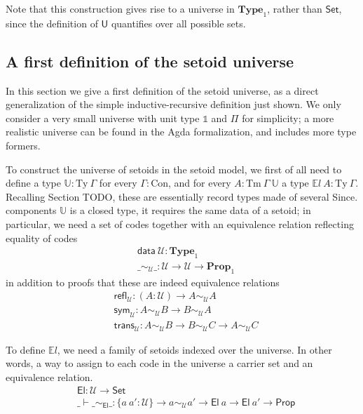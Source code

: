 \documentclass{easychair}
\newcommand{\GG}{\Gamma}
\newcommand{\setoidU}{\mathcal{U}}
\newcommand{\Set}{\textsf{Set}}
\newcommand{\mType}{\mathbf{Type}}
\newcommand{\Prop}{\textsf{Prop}}
\newcommand{\mProp}{\mathbf{Prop}}
\newcommand{\Con}{\mathrm{Con}}
\newcommand{\Ty}{\mathrm{Ty}}
\newcommand{\Tm}{\mathrm{Tm}}
\newcommand{\U}{\textsf{U}}
\newcommand{\El}{\textsf{El}}
\newcommand{\Uty}{\mathds{U}}
\newcommand{\EL}{\mathds{E}l}
\newcommand{\equ}[2]{#1 \sim_\setoidU #2}
\begin{document}
Note that this construction gives rise to a universe in $\mType_1$, rather than
$\Set$, since the definition of $\U$ quantifies over all possible sets.

\subsection{A first definition of the setoid universe}

In this section we give a first definition of the setoid universe, as a direct
generalization of the simple inductive-recursive definition just shown. We only
consider a very small universe with unit type $\mathds{1}$ and $\Pi$ for
simplicity; a more realistic universe can be found in the Agda formalization,
and includes more type formers.

To construct the universe of setoids in the setoid model, we first of all need
to define a type $\Uty : \Ty\ \GG$ for every $\GG : \Con$, and for every $A :
\Tm\ \GG\ \Uty$ a type $\mathds{E}l\ A : \Ty\ \GG$. Recalling Section TODO,
these are essentially record types made of several Since. components $\Uty$ is a
closed type, it requires the same data of a setoid; in particular, we need a set
of codes together with an equivalence relation reflecting equality of codes
%
\begin{align*}
  & \textsf{data} \ \setoidU : \mType_1 \\
  & \_\sim_\setoidU\_ : \setoidU \to \setoidU \to \mProp_1
\end{align*}
%
in addition to proofs that these are indeed equivalence relations
%
\begin{align*}
  & \textsf{refl}_\setoidU : (A : \setoidU) \to \equ{A}{A} \\
  & \textsf{sym}_\setoidU : \equ{A}{B} \to \equ{B}{A} \\
  & \textsf{trans}_\setoidU : \equ{A}{B} \to \equ{B}{C} \to \equ{A}{C}
\end{align*}

To define $\EL$, we need a family of setoids indexed over the universe. In other
words, a way to assign to each code in the universe a carrier set and an
equivalence relation.
%
\begin{align*}
  & \El : \setoidU \to \Set \\
  & \_\vdash\_\sim_\El\_ : \{a\ a' : \setoidU\} \to a \sim_\setoidU a' \to \El\ a \to \El\ a' \to \Prop
\end{align*}
\end{document}

